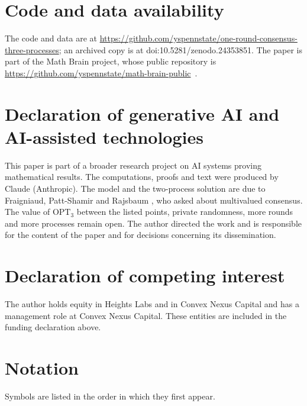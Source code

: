\documentclass[11pt]{article}
\theoremstyle{remark}
\newcommand{\OPT}{\mathrm{OPT}}
\begin{document}
\section*{Code and data availability}
The code and data are at \url{https://github.com/yspennstate/one-round-consensus-three-processes}; an archived copy is at doi:10.5281/zenodo.24353851. The paper is part of the Math Brain project, whose public repository is \url{https://github.com/yspennstate/math-brain-public}~\cite{MathBrainRepo}.

\section*{Declaration of generative AI and AI-assisted technologies}
This paper is part of a broader research project on AI systems proving mathematical results. The computations, proofs and text were produced by Claude (Anthropic). The model and the two-process solution are due to Fraigniaud, Patt-Shamir and Rajsbaum \cite{FPR}, who asked about multivalued consensus. The value of $\OPT_3$ between the listed points, private randomness, more rounds and more processes remain open. The author directed the work and is responsible for the content of the paper and for decisions concerning its dissemination.

\section*{Declaration of competing interest}
The author holds equity in Heights Labs and in Convex Nexus Capital and has a management role at Convex Nexus Capital. These entities are included in the funding declaration above.

\appendix
\section{Notation}\label{app:notation}
Symbols are listed in the order in which they first appear.
\end{document}
